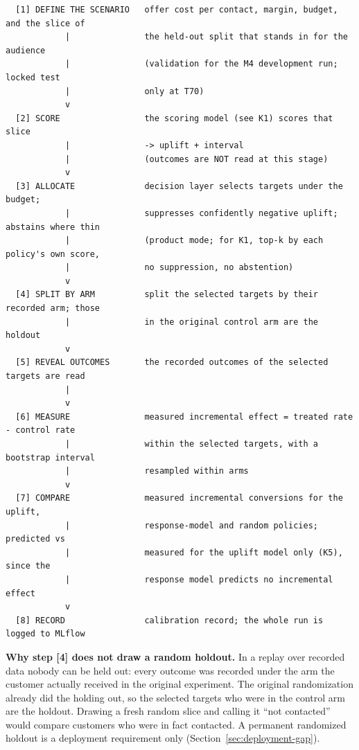 \documentclass[11pt,a4paper]{article}
\begin{document}
{\footnotesize
\begin{verbatim}
  [1] DEFINE THE SCENARIO   offer cost per contact, margin, budget, and the slice of
            |               the held-out split that stands in for the audience
            |               (validation for the M4 development run; locked test
            |               only at T70)
            v
  [2] SCORE                 the scoring model (see K1) scores that slice
            |               -> uplift + interval
            |               (outcomes are NOT read at this stage)
            v
  [3] ALLOCATE              decision layer selects targets under the budget;
            |               suppresses confidently negative uplift; abstains where thin
            |               (product mode; for K1, top-k by each policy's own score,
            |               no suppression, no abstention)
            v
  [4] SPLIT BY ARM          split the selected targets by their recorded arm; those
            |               in the original control arm are the holdout
            v
  [5] REVEAL OUTCOMES       the recorded outcomes of the selected targets are read
            |
            v
  [6] MEASURE               measured incremental effect = treated rate - control rate
            |               within the selected targets, with a bootstrap interval
            |               resampled within arms
            v
  [7] COMPARE               measured incremental conversions for the uplift,
            |               response-model and random policies; predicted vs
            |               measured for the uplift model only (K5), since the
            |               response model predicts no incremental effect
            v
  [8] RECORD                calibration record; the whole run is logged to MLflow
\end{verbatim}}

\textbf{Why step [4] does not draw a random holdout.} In a replay over recorded data nobody can be
held out: every outcome was recorded under the arm the customer actually received in the original
experiment. The original randomization already did the holding out, so the selected targets who
were in the control arm are the holdout. Drawing a fresh random slice and calling it
``not contacted'' would compare customers who were in fact contacted. A permanent randomized
holdout is a deployment requirement only (Section~\ref{sec:deployment-gap}).
\end{document}
